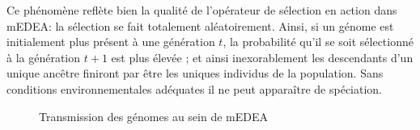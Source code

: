 \documentclass[a4paper,10pt]{report}
\begin{document}
Ce phénomène reflète bien la qualité de l'opérateur de sélection en action dans mEDEA: la sélection se fait totalement aléatoirement. Ainsi, si un génome est initialement plus présent à une génération $t$, la probabilité qu'il se soit sélectionné à la génération $t+1$ est plus élevée ; et ainsi inexorablement les descendants d'un unique ancêtre finiront par être les uniques individus de la population. Sans conditions environnementales adéquates il ne peut apparaître de spéciation.

\begin{figure}[H]
\centering
\advance\leftskip-4cm
\caption[Phylogénétique dans mEDEA]{Transmission des génomes au sein de mEDEA}
{}

\label{fig:trees}
\end{figure}
\end{document}
